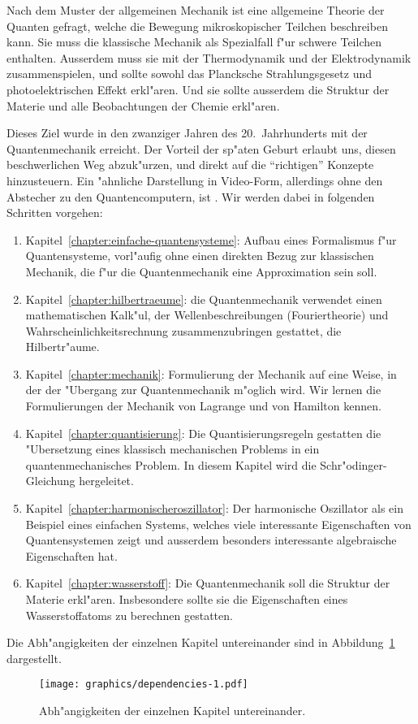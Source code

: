 Nach dem Muster der allgemeinen Mechanik ist eine allgemeine
Theorie der Quanten gefragt, welche die Bewegung mikroskopischer Teilchen
beschreiben kann. Sie muss die klassische Mechanik als Spezialfall
f"ur schwere Teilchen enthalten. Ausserdem muss sie mit der
Thermodynamik und der Elektrodynamik zusammenspielen, und sollte
sowohl das Plancksche Strahlungsgesetz und photoelektrischen
Effekt erkl"aren.
Und sie sollte ausserdem die Struktur der Materie und alle Beobachtungen
der Chemie erkl"aren.

Dieses Ziel wurde in den zwanziger Jahren des 20.~Jahrhunderts mit 
der Quantenmechanik erreicht.
Der Vorteil der sp"aten Geburt erlaubt uns, diesen beschwerlichen Weg
abzuk"urzen, und direkt auf die ``richtigen'' Konzepte hinzusteuern.
Ein "ahnliche Darstellung in Video-Form, allerdings ohne den Abstecher
zu den Quantencomputern, ist \cite{skript:viascience}.
Wir werden dabei in folgenden Schritten vorgehen:
\begin{enumerate}
\item Kapitel~\ref{chapter:einfache-quantensysteme}:
Aufbau eines Formalismus f"ur Quantensysteme, vorl"aufig ohne einen
direkten Bezug zur klassischen Mechanik, die f"ur die Quantenmechanik
eine Approximation sein soll.
\item Kapitel~\ref{chapter:hilbertraeume}: die Quantenmechanik verwendet
einen mathematischen Kalk"ul, der Wellenbeschreibungen (Fouriertheorie)
und Wahrscheinlichkeitsrechnung zusammenzubringen gestattet, die Hilbertr"aume.
\item Kapitel~\ref{chapter:mechanik}: Formulierung der Mechanik auf 
eine Weise, in der der "Ubergang zur Quantenmechanik m"oglich wird.
Wir lernen die Formulierungen der Mechanik von Lagrange und von Hamilton
kennen.
\item Kapitel~\ref{chapter:quantisierung}: Die Quantisierungsregeln
gestatten die "Ubersetzung eines klassisch mechanischen Problems in 
ein quantenmechanisches Problem. In diesem Kapitel wird die
Schr"odinger-Gleichung hergeleitet.
\item Kapitel~\ref{chapter:harmonischeroszillator}: Der harmonische
Oszillator als ein Beispiel eines einfachen Systems, welches
viele interessante Eigenschaften von Quantensystemen zeigt und 
ausserdem besonders interessante algebraische Eigenschaften hat.
\item Kapitel~\ref{chapter:wasserstoff}: Die Quantenmechanik soll
die Struktur der Materie erkl"aren. Insbesondere sollte sie 
die Eigenschaften eines Wasserstoffatoms zu berechnen gestatten.
\end{enumerate}

Die Abh"angigkeiten der einzelnen Kapitel untereinander sind in
Abbildung~\ref{dependencies} dargestellt.
\begin{figure}
\centering
\texttt{[image: graphics/dependencies-1.pdf]}
\caption{Abh"angigkeiten der einzelnen Kapitel untereinander.
\label{dependencies}}
\end{figure}



